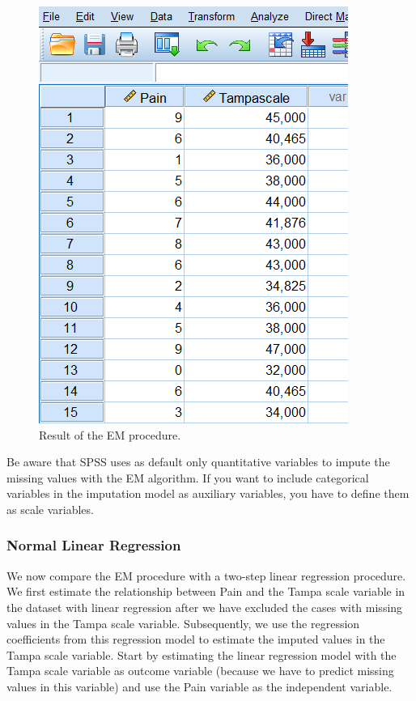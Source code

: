 \documentclass[]{book}
\theoremstyle{definition}
\theoremstyle{definition}
\theoremstyle{definition}
\theoremstyle{remark}
\begin{document}
\begin{figure}

{\centering \includegraphics[width=0.9\linewidth]{images/fig3.13} 

}

\caption{Result of the EM procedure.}\label{fig:fig3-13}
\end{figure}

Be aware that SPSS uses as default only quantitative variables to impute
the missing values with the EM algorithm. If you want to include
categorical variables in the imputation model as auxiliary variables,
you have to define them as scale variables.

\subsubsection{Normal Linear Regression}\label{normal-linear-regression}

We now compare the EM procedure with a two-step linear regression
procedure. We first estimate the relationship between Pain and the Tampa
scale variable in the dataset with linear regression after we have
excluded the cases with missing values in the Tampa scale variable.
Subsequently, we use the regression coefficients from this regression
model to estimate the imputed values in the Tampa scale variable. Start
by estimating the linear regression model with the Tampa scale variable
as outcome variable (because we have to predict missing values in this
variable) and use the Pain variable as the independent variable.
\end{document}
